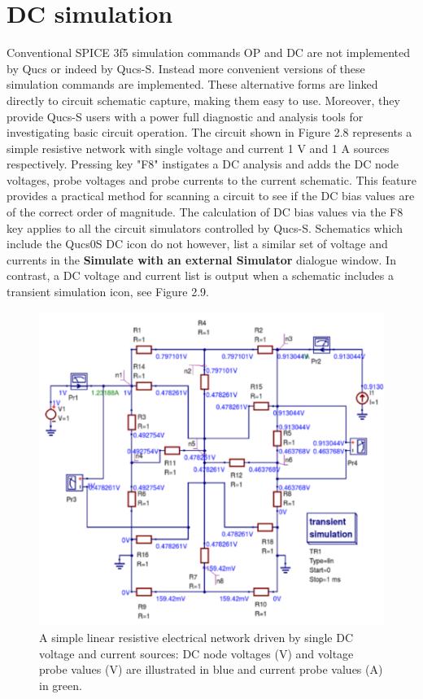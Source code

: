 \documentclass[10pt, a4paper]{report}
\begin{document}
\section{DC simulation}
Conventional SPICE 3f5 simulation commands OP and DC are not implemented by Qucs or indeed by Qucs-S. Instead more convenient versions of these simulation commands are implemented.  These alternative forms are linked directly to circuit schematic capture, making them easy to use.  Moreover, they provide Qucs-S users with a power full diagnostic and analysis tools for investigating basic circuit operation. The circuit shown in Figure 2.8 represents a simple resistive network with single voltage and current 1 V and 1 A sources respectively. Pressing key "F8" instigates a DC analysis and adds the DC node voltages, probe voltages and probe currents to the current schematic. This feature provides a practical method for scanning a circuit to see if the DC bias values are of the correct order of magnitude. The calculation of DC bias values via the F8 key applies to all the circuit simulators controlled by Qucs-S. Schematics which include the Qucs0S DC icon do not however, list a similar set of voltage and currents in the \textbf{Simulate with an external Simulator} dialogue window. In contrast, a DC voltage and current list is output when a schematic includes a transient simulation icon, see Figure 2.9.
 \begin{figure}[h]
	\centering
	\includegraphics[width=12cm]{pics/chap2/DC_list.pdf}
	\caption{A simple linear resistive electrical network driven by single DC voltage and current sources: DC node voltages (V) and voltage probe values (V) are illustrated in blue and current probe values (A) in green.}
	\label{Fig16}
\end{figure}
\end{document}
